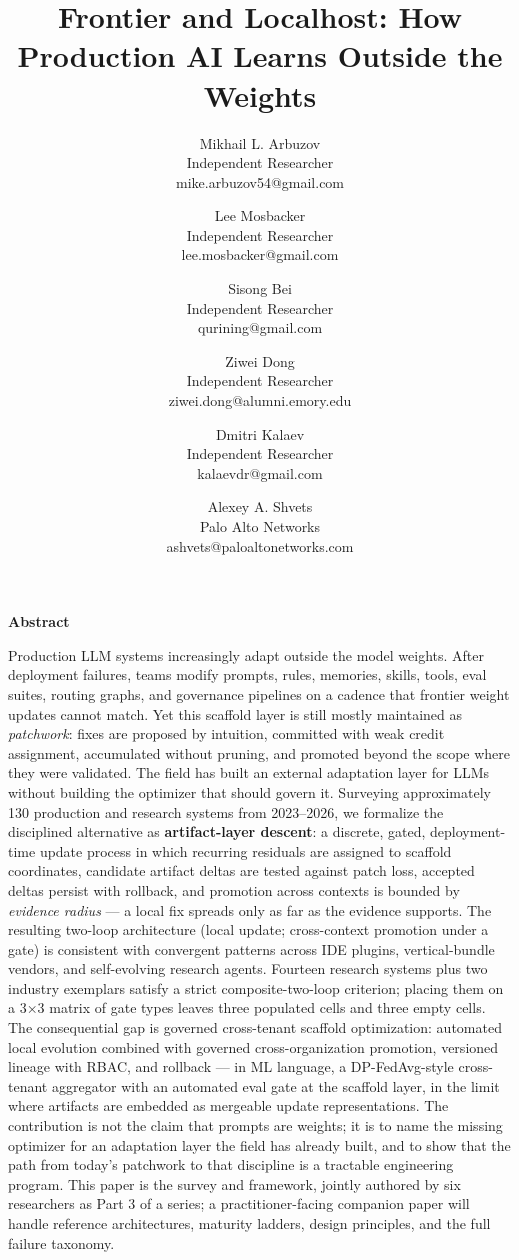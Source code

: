 \documentclass[
]{article}
\title{Frontier and Localhost: How Production AI Learns Outside the
Weights}
\author{Mikhail L. Arbuzov\\
Independent Researcher\\
mike.arbuzov54@gmail.com \and Lee Mosbacker\\
Independent Researcher\\
lee.mosbacker@gmail.com \and Sisong Bei\\
Independent Researcher\\
qurining@gmail.com \and Ziwei Dong\\
Independent Researcher\\
ziwei.dong@alumni.emory.edu \and Dmitri Kalaev\\
Independent Researcher\\
kalaevdr@gmail.com \and Alexey A. Shvets\\
Palo Alto Networks\\
ashvets@paloaltonetworks.com}
\date{}
\begin{document}
\maketitle

\textbf{Abstract}

Production LLM systems increasingly adapt outside the model weights.
After deployment failures, teams modify prompts, rules, memories,
skills, tools, eval suites, routing graphs, and governance pipelines on
a cadence that frontier weight updates cannot match. Yet this scaffold
layer is still mostly maintained as \emph{patchwork}: fixes are proposed
by intuition, committed with weak credit assignment, accumulated without
pruning, and promoted beyond the scope where they were validated. The
field has built an external adaptation layer for LLMs without building
the optimizer that should govern it. Surveying approximately 130
production and research systems from 2023--2026, we formalize the
disciplined alternative as \textbf{artifact-layer descent}: a discrete,
gated, deployment-time update process in which recurring residuals are
assigned to scaffold coordinates, candidate artifact deltas are tested
against patch loss, accepted deltas persist with rollback, and promotion
across contexts is bounded by \emph{evidence radius} --- a local fix
spreads only as far as the evidence supports. The resulting two-loop
architecture (local update; cross-context promotion under a gate) is
consistent with convergent patterns across IDE plugins, vertical-bundle
vendors, and self-evolving research agents. Fourteen research systems
plus two industry exemplars satisfy a strict composite-two-loop
criterion; placing them on a 3×3 matrix of gate types leaves three
populated cells and three empty cells. The consequential gap is governed
cross-tenant scaffold optimization: automated local evolution combined
with governed cross-organization promotion, versioned lineage with RBAC,
and rollback --- in ML language, a DP-FedAvg-style cross-tenant
aggregator with an automated eval gate at the scaffold layer, in the
limit where artifacts are embedded as mergeable update representations.
The contribution is not the claim that prompts are weights; it is to
name the missing optimizer for an adaptation layer the field has already
built, and to show that the path from today's patchwork to that
discipline is a tractable engineering program. This paper is the survey
and framework, jointly authored by six researchers as Part 3 of a
series; a practitioner-facing companion paper will handle reference
architectures, maturity ladders, design principles, and the full failure
taxonomy.
\end{document}
